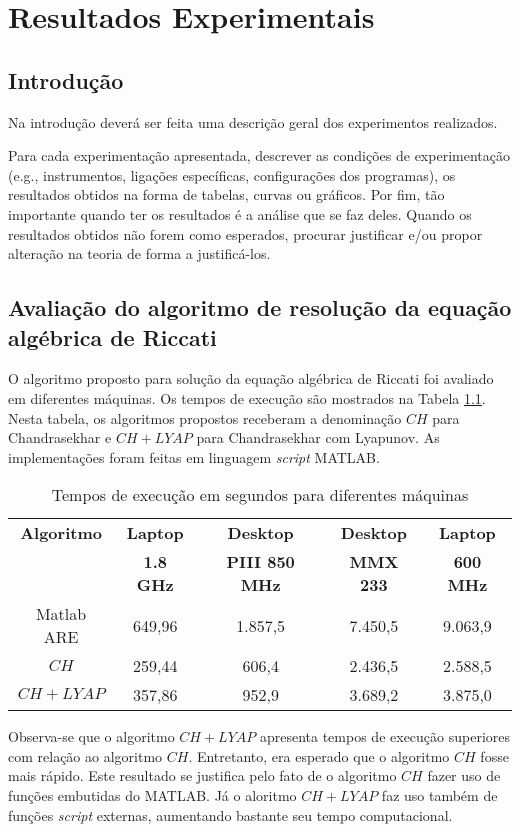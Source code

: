 ﻿%
                      
\chapter{Resultados Experimentais}\label{CapExperimentos}


\section{Introdução}

Na introdução deverá ser feita uma descrição geral dos experimentos realizados. 

Para cada experimentação apresentada, descrever as condições de experimentação (e.g., instrumentos, ligações específicas, configurações dos programas), os resultados obtidos na forma de tabelas, curvas ou gráficos. Por fim, tão importante quando ter os resultados é a análise que se faz deles. Quando os resultados obtidos não forem como esperados, procurar justificar e/ou propor alteração na teoria de forma a justificá-los.

\section{Avaliação do algoritmo de resolução da equação algébrica de Riccati}

O algoritmo proposto para solução da equação algébrica de Riccati foi avaliado em diferentes máquinas. Os tempos de execução são mostrados na Tabela \ref{TabDesempenho}. Nesta tabela, os algoritmos propostos receberam a denominação $CH$ para Chandrasekhar e $CH+LYAP$ para Chandrasekhar com Lyapunov. As implementações foram feitas em linguagem \textit{script} MATLAB.

\begin{table}[tbp]
\caption{Tempos de execução em segundos para diferentes máquinas}
\label{TabDesempenho}
\begin{center}
\begin{tabular}{c|c|c|c|c}
\hline
\textbf{Algoritmo} & \textbf{Laptop} & \textbf{Desktop} & \textbf{Desktop} & 
\textbf{Laptop} \\ 
& \textbf{1.8 GHz} & \textbf{PIII 850 MHz} & \textbf{MMX 233} & \textbf{600
MHz} \\ \hline
Matlab ARE & 649,96 & 1.857,5 & 7.450,5 & 9.063,9 \\ 
$CH$ & 259,44 & 606,4 & 2.436,5 & 2.588,5 \\ 
$CH+LYAP$ & 357,86 & 952,9 & 3.689,2 & 3.875,0 \\ \hline
\end{tabular}
\end{center}
\end{table}

Observa-se que o algoritmo $CH+LYAP$ apresenta tempos de execução superiores com relação ao algoritmo $CH$. Entretanto, era esperado que o algoritmo $CH$ fosse mais rápido. Este resultado se justifica pelo fato de o algoritmo $CH$ fazer uso de funções embutidas do MATLAB. Já o aloritmo $CH+LYAP$ faz uso também de funções \textit{script} externas, aumentando bastante seu tempo computacional.
